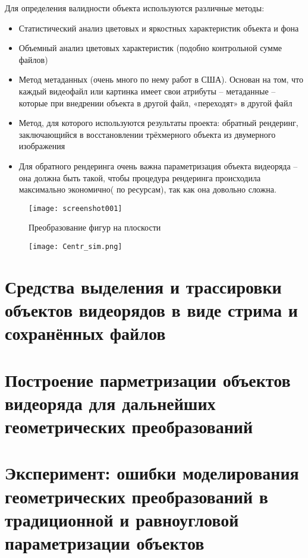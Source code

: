 \documentclass[]{article}
\begin{document}
		Для определения валидности объекта используются различные методы:
	
	\begin{itemize}[noitemsep]
		\item Статистический анализ цветовых и яркостных характеристик объекта и фона
		\item Объемный анализ цветовых характеристик (подобно контрольной сумме файлов)
		\item Метод метаданных (очень много по нему работ в США). Основан на том, что каждый видеофайл или картинка имеет свои атрибуты – метаданные – которые при внедрении объекта в другой файл, «переходят» в другой файл
		\item Метод, для которого используются результаты проекта: обратный рендеринг, заключающийся в восстановлении трёхмерного объекта из двумерного изображения
		\item Для обратного рендеринга очень важна параметризация объекта видеоряда – она должна быть такой, чтобы процедура рендеринга происходила максимально экономично( по ресурсам), так как она довольно сложна. 
	\end{itemize}

	\begin{figure}
		\centering
		\texttt{[image: screenshot001]}
		\caption{Преобразование фигур на плоскости}
		\label{screenshot001}
	\end{figure}
	
	\begin{figure}
		\centering
		\texttt{[image: Centr\_sim.png]}
		\caption{}
		\label{fig:Centr_sim}
	\end{figure}
	
	\newpage
	\section{Средства выделения и трассировки объектов видеорядов в виде стрима и сохранённых файлов}
	
	\newpage
	\section{Построение парметризации объектов видеоряда для дальнейших геометрических преобразований}
	
	\newpage
	\section{Эксперимент: ошибки моделирования геометрических преобразований в традиционной и равноугловой параметризации объектов}
	
\end{document}
